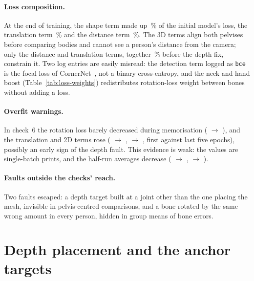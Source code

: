 \paragraph{Loss composition.} At the end of training, the shape term made up \DiagLossShareShape\,\% of the
initial model's loss, the translation term \DiagLossShareTransl\,\% and the distance term \DiagLossShareDist\,\%.
The 3D terms align both pelvises before comparing bodies and cannot see a person's distance from the camera; only the
distance and translation terms, together \DiagLossShareDepthTerms\,\% before the depth fix, constrain it. Two log entries are easily misread: the detection term
logged as \texttt{bce} is the focal loss of CornerNet~\cite{law2018cornernet}, not a binary cross-entropy, and the neck
and hand boost (Table~\ref{tab:loss-weights}) redistributes rotation-loss weight between bones without adding a loss.

\paragraph{Overfit warnings.} In check~6 the rotation loss barely decreased during memorisation
(\DiagOverfitRotFirst{} $\to$ \DiagOverfitRotLast), and the translation and 2D terms rose (\DiagOverfitTranslFirst{}
$\to$ \DiagOverfitTranslLast, \DiagOverfitTwoDFirst{} $\to$ \DiagOverfitTwoDLast, first against last five epochs),
possibly an early sign of the depth fault. This evidence is weak: the values are single-batch prints, and the half-run
averages decrease (\DiagOverfitTranslHalfA{} $\to$ \DiagOverfitTranslHalfB, \DiagOverfitTwoDHalfA{} $\to$
\DiagOverfitTwoDHalfB).

\paragraph{Faults outside the checks' reach.} Two faults escaped: a depth target built at a joint other than the one
placing the mesh, invisible in pelvis-centred comparisons, and a bone rotated by the same wrong amount in every person,
hidden in group means of bone errors.

\section{Depth placement and the anchor targets}
\label{sec:diag-depth}

